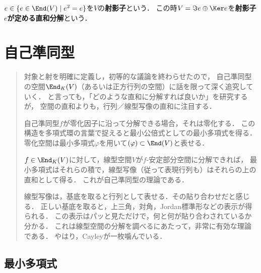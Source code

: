 \documentclass[uplatex, dvipdfmx]{jsreport}
\begin{document}
\begin{definition}[projector]
    $e\in\{e\in\End(V)\mid e^2=e\}$を$V$の\textbf{射影子}という．
    この時$V=\Im e\oplus\Ker e$を\textbf{射影子$e$が定める直和分解}という．  
\end{definition}

\chapter{自己準同型}

\begin{quotation}
    対象と射を明確に定義し，初等的な議論を終わらせたので，
    自己準同型の空間$\End_K(V)$（あるいは正方行列の空間）に話を限って深く追究していく．
    と言っても，「どのような直和に分解すれば良いか」を研究するが，
    空間の直和よりも，行列／線型写像の直和に注目する．

    自己準同型$f$が零化因子に沿って分解できる場合，それは零化する．
    この構造を多項式環の言葉で捉えると最小公倍式としての最小多項式を得る．
    零化空間は最小多項式$\varphi$を用いて$(\varphi)\subset\End(V)$と表せる．

    $f\in\End_K(V)$に対して，線型空間$V$が$f$-安定部分空間に分解できれば，
    最小多項式はそれらの積で，線型写像（従って表現行列も）はそれらの上の直和として得る．
    これが自己準同型の理論である．

    線型写像は，基底を取ると行列として表せる．その貼り合わせだと感じる．
    正しい基底を取ると，上三角，対角，Jordan標準形などの表示が得られる．
    この表示はパッと見ただけで，何と何が貼り合わされているか分かる．
    これは線型空間の分解を調べるにあたって，非常に有効な理論である．
    やはり，Cayleyが一枚噛んでいる．
\end{quotation}

\section{最小多項式}
\end{document}
